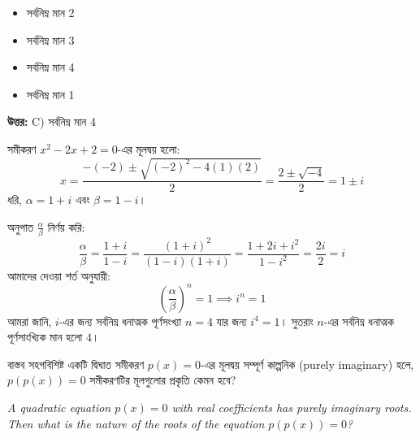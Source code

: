 \documentclass[12pt, a4paper]{article}
\begin{document}
\begin{itemize}[label={}, leftmargin=1cm, itemsep=0.5em]
    \item[\textbf{A)}] সর্বনিম্ন মান 2
    \item[\textbf{B)}] সর্বনিম্ন মান 3
    \item[\textbf{C)}] সর্বনিম্ন মান 4
    \item[\textbf{D)}] সর্বনিম্ন মান 1
\end{itemize}

\vspace{0.5em}
\begin{tcolorbox}[answerbox]
    \textbf{\color{success} উত্তর:} C) সর্বনিম্ন মান 4
\end{tcolorbox}
\vspace{1em}

\begin{tcolorbox}[solutionbox={সমাধান (Solution)}]
    \noindent
    সমীকরণ $x^2 - 2x + 2 = 0$-এর মূলদ্বয় হলো:
    \[ x = \frac{-(-2) \pm \sqrt{(-2)^2 - 4(1)(2)}}{2} = \frac{2 \pm \sqrt{-4}}{2} = 1 \pm i \]
    ধরি, $\alpha = 1+i$ এবং $\beta = 1-i$। 
    
    \vspace{0.5em}
    অনুপাত $\frac{\alpha}{\beta}$ নির্ণয় করি:
    \[ \frac{\alpha}{\beta} = \frac{1+i}{1-i} = \frac{(1+i)^2}{(1-i)(1+i)} = \frac{1 + 2i + i^2}{1 - i^2} = \frac{2i}{2} = i \]
    আমাদের দেওয়া শর্ত অনুযায়ী:
    \[ \left(\frac{\alpha}{\beta}\right)^n = 1 \implies i^n = 1 \]
    আমরা জানি, $i$-এর জন্য সর্বনিম্ন ধনাত্মক পূর্ণসংখ্যা $n = 4$ যার জন্য $i^4 = 1$। সুতরাং $n$-এর সর্বনিম্ন ধনাত্মক পূর্ণসাংখ্যিক মান হলো $4$।
\end{tcolorbox}
\vspace{1em}

\begin{tcolorbox}[questionbox={প্রশ্ন (Question) 33}]
    \noindent
    বাস্তব সহগবিশিষ্ট একটি দ্বিঘাত সমীকরণ $p(x) = 0$-এর মূলদ্বয় সম্পূর্ণ কাল্পনিক (purely imaginary) হলে, $p(p(x)) = 0$ সমীকরণটির মূলগুলোর প্রকৃতি কেমন হবে?
    
    \vspace{0.8em}
    \begin{english}
    \noindent\textit{\color{darkgray}
    A quadratic equation $p(x) = 0$ with real coefficients has purely imaginary roots. Then what is the nature of the roots of the equation $p(p(x)) = 0$?
    }
    \end{english}
\end{tcolorbox}
\end{document}
